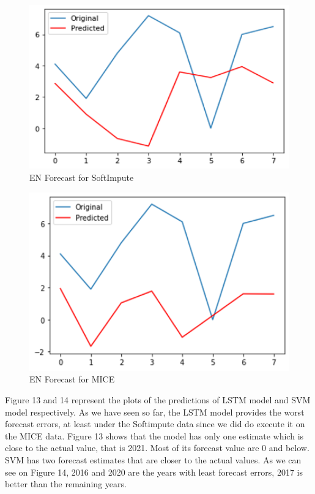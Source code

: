 \documentclass[12pt,italian, twoside]{report}
\begin{document}
\begin{figure}[t]
	\centering
	\includegraphics[width = 130mm]{immagini/EN.png}
	\caption{EN Forecast for SoftImpute}
	\label{fig:EN_soft}
\end{figure}
\begin{figure}[t]
	\centering
	\includegraphics[width = 130mm]{immagini/EN1.png}
	\caption{EN Forecast for MICE}
	\label{fig:EN_MICE}
\end{figure}
Figure 13 and 14 represent the plots of the predictions of LSTM model and SVM model respectively. As we have seen so far, the LSTM model provides the worst forecast errors, at least under the Softimpute data since we did do execute it on the MICE data. Figure 13 shows that the model has only one estimate which is close to the actual value, that is 2021. Most of its forecast value are 0 and below. SVM has two forecast estimates that are closer to the actual values. As we can see on Figure 14, 2016 and 2020 are the years with least forecast errors, 2017 is better than the remaining years.
\end{document}

